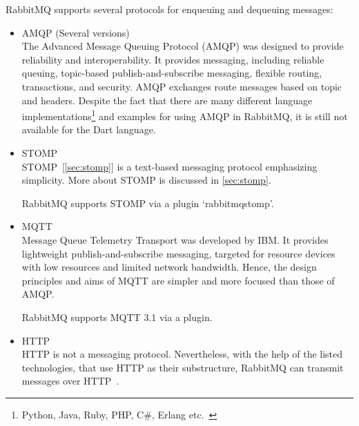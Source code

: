 RabbitMQ supports several protocols for enqueuing and dequeuing messages:
\begin{itemize}
  \item AMQP (Several versions)\\
  The Advanced Message Queuing Protocol (AMQP) was designed to provide reliability and interoperability. It provides messaging, including reliable queuing, topic-based publish-and-subscribe messaging, flexible routing, transactions, and security. AMQP exchanges route messages based on topic and headers\cite{andyPiperVmware}.
  Despite the fact that there are many different language implementations\footnote{Python, Java, Ruby, PHP, C\#, Erlang etc.~\cite{rabbitmqGetstarted}} and examples for using AMQP in RabbitMQ, it is still not available for the Dart language.

  \item STOMP\\
  STOMP~[\autoref{sec:stomp}] is a text-based messaging protocol emphasizing simplicity. More about STOMP is discussed in \autoref{sec:stomp}.

  RabbitMQ supports STOMP via a plugin \textendash{} ‘rabbitmq\textunderscore{}stomp’.

  \item MQTT\\
  Message Queue Telemetry Transport was developed by IBM. It provides lightweight publish-and-subscribe messaging, targeted for resource devices with low resources and limited network bandwidth. Hence, the design principles and aims of MQTT are simpler and more focused than those of AMQP.~\cite{andyPiperVmware}

  RabbitMQ supports MQTT 3.1 via a plugin.
  \item HTTP\\
  HTTP is not a messaging protocol. Nevertheless, with the help of the listed technologies, that use HTTP as their substructure, RabbitMQ can transmit messages over HTTP~\cite{rabbitmqProtocols}.

\end{itemize}

